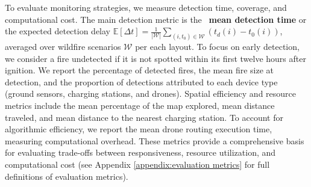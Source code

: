 \documentclass{article}
\begin{document}
To evaluate monitoring strategies, we measure detection time, coverage, and computational cost. The main detection metric is the ~\textbf{mean detection time} or the expected detection delay $\mathbb{E}[\Delta t] = \frac{1}{|\mathcal{W}|} \sum_{(i, t_0) \in \mathcal{W}} (t_d(i) - t_0(i))$, averaged over wildfire scenarios $\mathcal{W}$ per each layout. To focus on early detection, we consider a fire undetected if it is not spotted within its first twelve hours after ignition. We report the percentage of  detected fires, the mean fire size at detection, and the proportion of detections attributed to each device type (ground sensors, charging stations, and drones). Spatial efficiency and resource metrics include the mean percentage of the map explored, mean distance traveled, and mean distance to the nearest charging station. To account for algorithmic efficiency, we report the mean drone routing execution time, measuring computational overhead. These metrics provide a comprehensive basis for evaluating trade-offs between responsiveness, resource utilization, and computational cost (see Appendix \ref{appendix:evaluation metrics} for full definitions of evaluation metrics).









\end{document}
